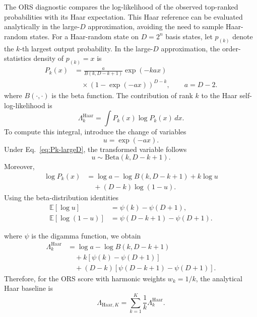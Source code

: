 \documentclass[
    aps,
    pre,
    amsmath,
    amssymb,
    reprint,
    superscriptaddress,
    preprintnumbers,
]{revtex4-2}
\begin{document}
The ORS diagnostic compares the log-likelihood of the observed top-ranked probabilities with its Haar expectation. This Haar reference can be evaluated analytically in the large-$D$ approximation, avoiding the need to sample Haar-random states. For a Haar-random state on $D=2^n$ basis states, let $p_{(k)}$ denote the $k$-th largest output probability. In the large-$D$ approximation, the order-statistics density of $p_{(k)}=x$ is
\begin{equation}
\begin{aligned}
P_k(x)
&=
\frac{a}{B(k,D-k+1)}
\exp(-k a x)
\\
&\quad \times
\left(1-\exp(-a x)\right)^{D-k},
\qquad
a=D-2 .
\end{aligned}
\label{eq:Pk-largeD}
\end{equation}
%
where $B(\cdot,\cdot)$ is the beta function. The contribution of rank $k$ to the Haar self-log-likelihood is
\begin{equation}
\Lambda_{k}^{\mathrm{Haar}}
=
\int P_k(x)\log P_k(x)\,dx .
\label{eq:lambda-k-haar-def}
\end{equation}
To compute this integral, introduce the change of variables
\begin{equation}
u=\exp(-a x).
\end{equation}
Under Eq.~\eqref{eq:Pk-largeD}, the transformed variable follows
\begin{equation}
u \sim \mathrm{Beta}(k,D-k+1).
\end{equation}
Moreover,
\begin{equation}
\begin{aligned}
\log P_k(x)
&=
\log a
-
\log B(k,D-k+1)
+
k\log u
\\
&\quad
+
(D-k)\log(1-u).
\end{aligned}
\end{equation}
Using the beta-distribution identities
\begin{equation}
\begin{aligned}
\mathbb{E}[\log u]
&=
\psi(k)-\psi(D+1),
\\
\mathbb{E}[\log(1-u)]
&=
\psi(D-k+1)-\psi(D+1).
\end{aligned}
\end{equation}

where $\psi$ is the digamma function, we obtain
\begin{align}
\Lambda_{k}^{\mathrm{Haar}}
&=
\log a
-
\log B(k,D-k+1)
\nonumber\\
&\quad + k\left[\psi(k)-\psi(D+1)\right]
\nonumber\\
&\quad + (D-k) \left[\psi(D-k+1)-\psi(D+1)\right].
\label{eq:lambda-k-haar}
\end{align}
Therefore, for the ORS score with harmonic weights $w_k=1/k$, the analytical Haar baseline is
\begin{equation}
\Lambda_{\mathrm{Haar},K}
=
\sum_{k=1}^{K}
\frac{1}{k}
\Lambda_{k}^{\mathrm{Haar}}.
\label{eq:lambda-haar-k}
\end{equation}
\end{document}
